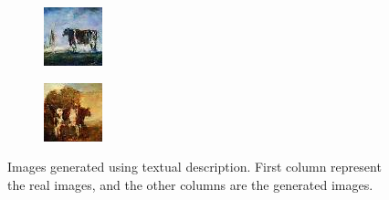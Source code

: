 \documentclass[a4paper]{article}
\begin{document}
\begin{figure}[!h]
\begin{minipage}[ht]{0.5\textwidth}
\begin{subfigure}[b]{0.2\textwidth}
        \includegraphics[width=\textwidth]{cow_3.jpg}
    \end{subfigure}
    \begin{subfigure}[b]{0.2\textwidth}
        \includegraphics[width=\textwidth]{cow_4.jpg}
    \end{subfigure}
  \end{minipage}
\end{figure}
\vspace*{-5mm}
\begin{figure}[!h]\ContinuedFloat
    \centering
    \caption{Images generated using textual description. First column represent the real images, and the other columns are the generated images.}
    \label{fig:gen_images}
\end{figure}
\end{document}
